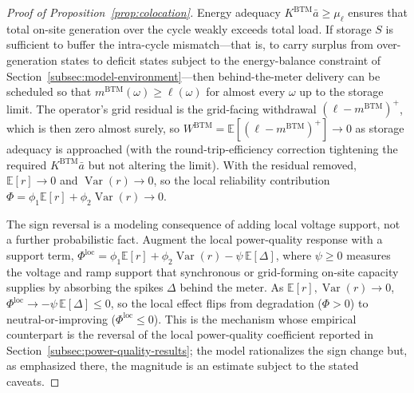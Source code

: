 \documentclass[a4paper,fleqn,longmktitle]{cas-sc}
\theoremstyle{plain}
\theoremstyle{definition}
\newcommand{\E}{\mathbb{E}}
\newcommand{\Var}{\operatorname{Var}}
\newcommand{\pos}[1]{\left(#1\right)^{+}}
\newcommand{\BTM}{\mathrm{BTM}}
\begin{document}
\begin{proof}[Proof of Proposition~\ref{prop:colocation}]
Energy adequacy $K^{\BTM}\bar a\ge\mu_\ell$ ensures that total on-site generation over the cycle weakly exceeds total load. If storage $S$ is sufficient to buffer the intra-cycle mismatch---that is, to carry surplus from over-generation states to deficit states subject to the energy-balance constraint of Section~\ref{subsec:model-environment}---then behind-the-meter delivery can be scheduled so that $m^{\BTM}(\omega)\ge\ell(\omega)$ for almost every $\omega$ up to the storage limit. The operator's grid residual is the grid-facing withdrawal $\pos{\ell-m^{\BTM}}$, which is then zero almost surely, so $W^{\BTM}=\E[\pos{\ell-m^{\BTM}}]\to 0$ as storage adequacy is approached (with the round-trip-efficiency correction tightening the required $K^{\BTM}\bar a$ but not altering the limit). With the residual removed, $\E[r]\to 0$ and $\Var(r)\to 0$, so the local reliability contribution $\Phi=\phi_1\E[r]+\phi_2\Var(r)\to 0$.

The sign reversal is a modeling consequence of adding local voltage support, not a further probabilistic fact. Augment the local power-quality response with a support term, $\Phi^{\mathrm{loc}}=\phi_1\E[r]+\phi_2\Var(r)-\psi\,\E[\Delta]$, where $\psi\ge 0$ measures the voltage and ramp support that synchronous or grid-forming on-site capacity supplies by absorbing the spikes $\Delta$ behind the meter. As $\E[r],\Var(r)\to 0$, $\Phi^{\mathrm{loc}}\to-\psi\,\E[\Delta]\le 0$, so the local effect flips from degradation ($\Phi>0$) to neutral-or-improving ($\Phi^{\mathrm{loc}}\le 0$). This is the mechanism whose empirical counterpart is the reversal of the local power-quality coefficient reported in Section~\ref{subsec:power-quality-results}; the model rationalizes the sign change but, as emphasized there, the magnitude is an estimate subject to the stated caveats.
\end{proof}
\end{document}
